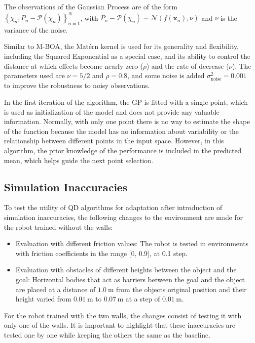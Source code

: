 \documentclass[12pt]{article}
\begin{document}
The observations of the Gaussian Process are of the form $\left\{ \chi_n, P_n - \mathcal{P}(\chi_n) \right\}_{n=1}^{N}$, with $P_n - \mathcal{P}(\chi_n) \sim \mathcal{N}(f(\mathbf{x}_n), \nu)$ and $\nu$ is the variance of the noise.

Similar to M-BOA, the Matérn kernel is used for its generality and flexibility, including the Squared Exponential as a special case, and its ability to control the distance at which effects become nearly zero ($\rho$) and the rate of decrease ($\nu$). The parameters used are $\nu=5/2$ and $\rho=0.8$, and some noise is added $\sigma_{\text{noise}}^2=0.001$ to improve the robustness to noisy observations.

In the first iteration of the algorithm, the GP is fitted with a single point, which is used as initialization of the model and does not provide any valuable information. Normally, with only one point there is no way to estimate the shape of the function because the model has no information about variability or the relationship between different points in the input space. However, in this algorithm, the prior knowledge of the performance is included in the predicted mean, which helps guide the next point selection. 




\subsection{Simulation Inaccuracies}
To test the utility of QD algorithms for adaptation after introduction of simulation inaccuracies, the following changes to the environment are made for the robot trained without the walls:
\begin{itemize}
\item Evaluation with different friction values: The robot is tested in environments with friction coefficients in the range [0, 0.9], at 0.1 step.
\item Evaluation with obstacles of different heights between the object and the goal: Horizontal bodies that act as barriers between the goal and the object are placed at a distance of $1.0\ \text{m}$ from the objects original position and their height varied from $0.01\ \text{m}$ to $0.07\ \text{m}$ at a step of $0.01\ \text{m}$.
\end{itemize} 
For the robot trained with the two walls, the changes consist of testing it with only one of the walls.
It is important to highlight that these inaccuracies are tested one by one while keeping the others the same as the baseline.
\end{document}

